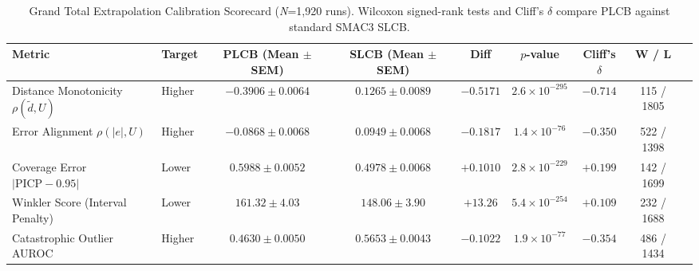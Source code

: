 \begin{table}[htbp]
\centering
\caption{Grand Total Extrapolation Calibration Scorecard (\textit{N}=1,920 runs). Wilcoxon signed-rank tests and Cliff's $\delta$ compare PLCB against standard SMAC3 SLCB.}
\label{tab:executive_scorecard}
\small
\begin{tabular}{llccccccc}
\toprule
\textbf{Metric} & \textbf{Target} & \textbf{PLCB (Mean $\pm$ SEM)} & \textbf{SLCB (Mean $\pm$ SEM)} & \textbf{Diff} & \textbf{$p$-value} & \textbf{Cliff's $\delta$} & \textbf{W / L} \\
\midrule
Distance Monotonicity $\rho(\tilde d, U)$ & Higher & $-0.3906 \pm 0.0064$ & $0.1265 \pm 0.0089$ & $-0.5171$ & $2.6 \times 10^{-295}$ & $-0.714$ & 115 / 1805 \\
Error Alignment $\rho(|e|, U)$ & Higher & $-0.0868 \pm 0.0068$ & $0.0949 \pm 0.0068$ & $-0.1817$ & $1.4 \times 10^{-76}$ & $-0.350$ & 522 / 1398 \\
Coverage Error $|\mathrm{PICP} - 0.95|$ & Lower & $0.5988 \pm 0.0052$ & $0.4978 \pm 0.0068$ & $+0.1010$ & $2.8 \times 10^{-229}$ & $+0.199$ & 142 / 1699 \\
Winkler Score (Interval Penalty) & Lower & $161.32 \pm 4.03$ & $148.06 \pm 3.90$ & $+13.26$ & $5.4 \times 10^{-254}$ & $+0.109$ & 232 / 1688 \\
Catastrophic Outlier AUROC & Higher & $0.4630 \pm 0.0050$ & $0.5653 \pm 0.0043$ & $-0.1022$ & $1.9 \times 10^{-77}$ & $-0.354$ & 486 / 1434 \\
\bottomrule
\end{tabular}
\end{table}